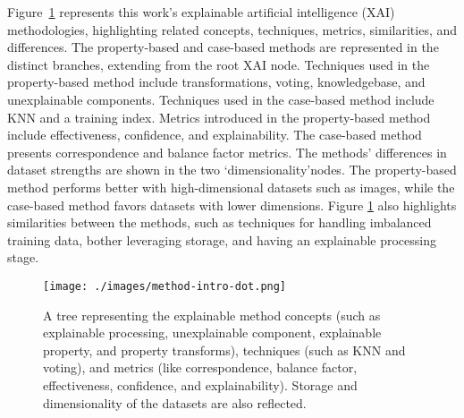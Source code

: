 Figure~\ref{fig:method_concepts} represents this work's explainable artificial
intelligence (XAI) methodologies, highlighting related concepts, techniques,
metrics, similarities, and differences. The property-based and case-based
methods are represented in the distinct branches, extending from the root XAI
node. Techniques used in the property-based method include transformations,
voting, knowledgebase, and unexplainable components. Techniques used in the
case-based method include KNN and a training index. Metrics introduced in the
property-based method include effectiveness, confidence, and explainability. The
case-based method presents correspondence and balance factor metrics. The
methods' differences in dataset strengths are shown in the two
\lq{dimensionality}\rq nodes. The property-based method performs better with
high-dimensional datasets such as images, while the case-based method favors
datasets with lower dimensions. Figure \ref{fig:method_concepts} also highlights
similarities between the methods, such as techniques for handling imbalanced
training data, bother leveraging storage, and having an explainable processing
stage.

\begin{figure}[H]
    \centerline{\texttt{[image: ./images/method-intro-dot.png]}}
    \caption{A tree representing the explainable method concepts (such as explainable processing, unexplainable component, explainable property, and property transforms), techniques (such as KNN and voting), and metrics (like correspondence, balance factor, effectiveness, confidence, and explainability). Storage and dimensionality of the datasets are also reflected.}
    \label{fig:method_concepts}
\end{figure}




